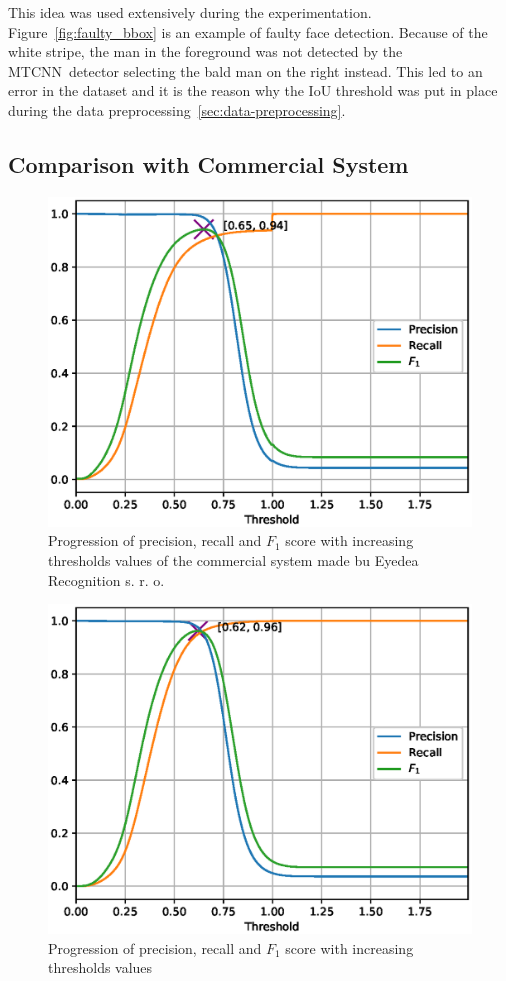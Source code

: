 This idea was used extensively during the experimentation.
Figure~\ref{fig:faulty_bbox} is an example of faulty face detection.
Because of the white stripe, the man in the foreground was not detected by the MTCNN detector selecting the bald man
on the right instead.
This led to an error in the dataset and it is the reason why the IoU threshold was put in place during the data
preprocessing~\ref{sec:data-preprocessing}.

\subsection{Comparison with Commercial System}\label{subsec:comparison-with-commercial-system}

\begin{figure}[H]
    \centering
    \includegraphics{images/implementation/prft_eyedea.eps}
    \caption{Progression of precision, recall and $F_1$ score with increasing thresholds values of the commercial
    system made bu Eyedea Recognition s. r. o.}
    \label{fig:prft_eyedea}
\end{figure}

\begin{figure}[H]
    \centering
    \includegraphics{images/implementation/prft_fav-128_N1.eps}
    \caption{Progression of precision, recall and $F_1$ score with increasing thresholds values}
    \label{fig:prft}
\end{figure}